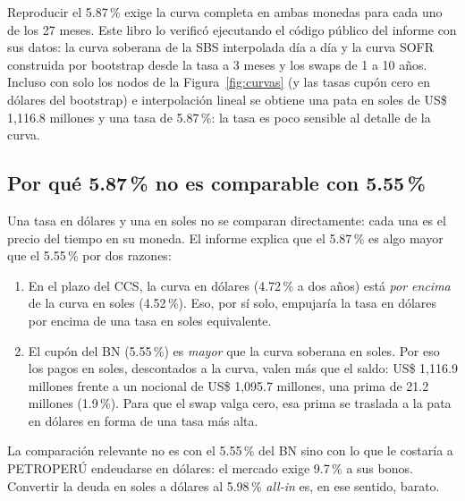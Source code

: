 
\begin{adicional}
Reproducir el 5.87\,\% exige la curva completa en ambas monedas para cada uno de los 27 meses. Este libro lo verificó ejecutando el código público del informe con sus datos: la curva soberana de la SBS interpolada día a día y la curva SOFR construida por bootstrap desde la tasa a 3 meses y los swaps de 1 a 10 años. Incluso con solo los nodos de la Figura~\ref{fig:curvas} (y las tasas cupón cero en dólares del bootstrap) e interpolación lineal se obtiene una pata en soles de US\$ 1,116.8 millones y una tasa de 5.87\,\%: la tasa es poco sensible al detalle de la curva.
\end{adicional}

\subsection{Por qué 5.87\,\% no es comparable con 5.55\,\%}

Una tasa en dólares y una en soles no se comparan directamente: cada una es el precio del tiempo en su moneda. El informe explica que el 5.87\,\% es algo mayor que el 5.55\,\% por dos razones:
\begin{enumerate}
\item En el plazo del CCS, la curva en dólares (4.72\,\% a dos años) está \emph{por encima} de la curva en soles (4.52\,\%). Eso, por sí solo, empujaría la tasa en dólares por encima de una tasa en soles equivalente.
\item El cupón del BN (5.55\,\%) es \emph{mayor} que la curva soberana en soles. Por eso los pagos en soles, descontados a la curva, valen más que el saldo: US\$ 1,116.9 millones frente a un nocional de US\$ 1,095.7 millones, una prima de 21.2 millones (1.9\,\%). Para que el swap valga cero, esa prima se traslada a la pata en dólares en forma de una tasa más alta.
\end{enumerate}

\begin{importante}
La comparación relevante no es con el 5.55\,\% del BN sino con lo que le costaría a PETROPERÚ endeudarse en dólares: el mercado exige 9.7\,\% a sus bonos. Convertir la deuda en soles a dólares al 5.98\,\% \emph{all-in} es, en ese sentido, barato.
\end{importante}

